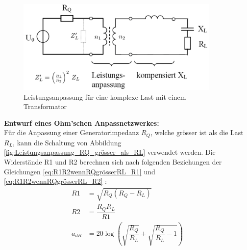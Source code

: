 \begin{figure}[!ht]
	\centering
	\includegraphics[width=10cm]{content/bilder/AnpassungKomplexerLast.pdf}%
	\caption{Leistungsanpassung für eine komplexe Last mit einem Transformator\cite{Tekom}}
	\label{AnpassungKomplexerLast}
\end{figure}
\newpage
\textbf{Entwurf eines Ohm’schen Anpassnetzwerkes:} \\
Für die Anpassung einer Generatorimpedanz $R_Q$, welche grösser ist als die Last $R_L$, kann die Schaltung von Abbildung \ref{fig:Leistungsanpassung_RQ_grösser_als_RL} verwendet werden. Die Widerstände R1 und R2 berechnen sich nach folgenden Beziehungen der Gleichungen \ref{eq:R1R2wennRQgrösserRL_R1} und \ref{eq:R1R2wennRQgrösserRL_R2} \cite{Tekom}:
	\begin{align}
		R1 &= \sqrt{R_Q(R_Q-R_L)} \label{eq:R1R2wennRQgrösserRL_R1} \\
		R2 &= \dfrac{R_Q R_L}{R1} \label{eq:R1R2wennRQgrösserRL_R2} \\
		a_{dB} &= 20\log \left( \sqrt{\dfrac{R_Q}{R_L}}+\sqrt{\dfrac{R_Q}{R_L}-1}\right)
	\end{align}

